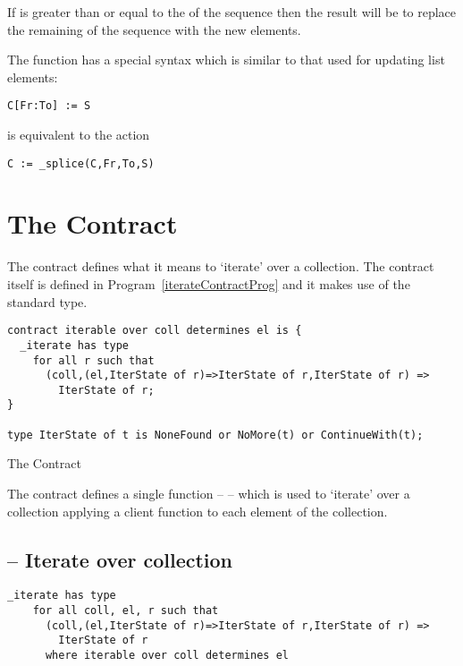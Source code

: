 If  is greater than or equal to the  of the sequence then the result will be to replace the remaining of the sequence with the new elements.

The  function has a special syntax which is similar to that used for updating list elements:
\begin{lstlisting}
C[Fr:To] := S
\end{lstlisting}
is equivalent to the action
\begin{lstlisting}
C := _splice(C,Fr,To,S)
\end{lstlisting}

\section{The  Contract}
\label{iterableContract}
The  contract defines what it means to `iterate' over a collection. The contract itself is defined in Program~\vref{iterateContractProg} and it makes use of the standard  type.

\begin{program}[H]
\begin{lstlisting}
contract iterable over coll determines el is {
  _iterate has type 
    for all r such that 
      (coll,(el,IterState of r)=>IterState of r,IterState of r) => 
        IterState of r;
}

type IterState of t is NoneFound or NoMore(t) or ContinueWith(t);
\end{lstlisting}
\caption{The  Contract\label{iterateContractProg}}
\end{program}

The  contract defines a single function --  -- which is used to `iterate' over a collection applying a client function to each element of the collection.

\subsection{ -- Iterate over collection}
\label{iterateFunction}
\begin{lstlisting}
_iterate has type 
    for all coll, el, r such that 
      (coll,(el,IterState of r)=>IterState of r,IterState of r) => 
        IterState of r 
      where iterable over coll determines el
\end{lstlisting}

